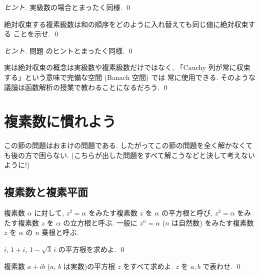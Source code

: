 \documentclass[12pt,twoside]{jarticle}
\begin{document}
\begin{proof}[ヒント]
 実級数の場合とまったく同様. \qed
\end{proof}

\begin{question}
 絶対収束する複素級数は和の順序をどのように入れ替えても同じ値に絶対収束する
 ことを示せ. \qed
\end{question}

\begin{proof}[ヒント]
 問題  のヒントとまったく同様. \qed
\end{proof}

\begin{guide}
 実は絶対収束の概念は実級数や複素級数だけではなく, 
 「Cauchy 列が常に収束する」という意味で完備な空間 (Banach 空間) では
 常に使用できる. そのような議論は函数解析の授業で教わることになるだろう.
 \qed
\end{guide}


\section{複素数に慣れよう}

この節の問題はおまけの問題である.
したがってこの節の問題を全く解かなくても後の方で困らない.
(こちらが出した問題をすべて解こうなどと決して考えないように!)


\subsection{複素数と複素平面}

複素数 $\alpha$ に対して, $z^2 = \alpha$ をみたす複素数 $z$ を %
$\alpha$ の平方根と呼び, $z^3 = \alpha$ をみたす複素数 $z$ を $\alpha$ %
の立方根と呼ぶ. 一般に $z^n = \alpha$ ($n$ は自然数) をみたす複素数 %
$z$ を $\alpha$ の $n$ 乗根と呼ぶ.

\begin{question}
  $i$, $1 + i$, $1 - \sqrt{3}\,i$ の平方根を求めよ. \qed
\end{question}

\begin{question}
  複素数 $a + ib$ ($a$, $b$ は実数)の平方根 $z$ をすべて求めよ. 
  $z$ を $a,b$ で表わせ. \qed
\end{question}
\end{document}
